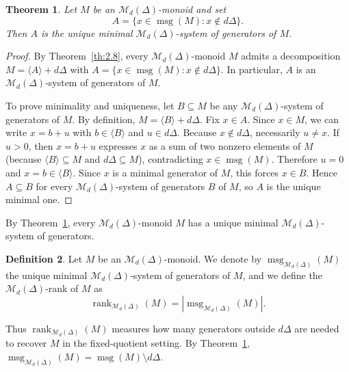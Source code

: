 \documentclass[12pt,a4paper]{amsart}
\newtheorem{theorem}{Theorem}[section]
\theoremstyle{definition}
\newtheorem{definition}[theorem]{Definition}
\theoremstyle{remark}
\begin{document}
\begin{theorem}\label{thm:Md-min-gen}
Let $M$ be an $\mathcal{M}_d(\Delta)$-monoid and set
\[
A=\{x\in \operatorname{msg}(M): x\notin d\Delta\}.
\]
Then $A$ is the unique minimal $\mathcal{M}_d(\Delta)$-system of generators of $M$.
\end{theorem}

\begin{proof}
By Theorem~\ref{th:2.8}, every $\mathcal{M}_d(\Delta)$-monoid $M$ admits a decomposition $M=\langle A\rangle+d\Delta$ with 
$A=\{x\in \operatorname{msg}(M): x\notin d\Delta\}$. In particular, $A$ is an $\mathcal{M}_d(\Delta)$-system of generators of $M$.

To prove minimality and uniqueness, let $B\subseteq M$ be any $\mathcal{M}_d(\Delta)$-system of generators of $M$. By definition,
$M=\langle B\rangle+d\Delta$. Fix $x\in A$. Since $x\in M$, we can write $x=b+u$ with $b\in\langle B\rangle$ and $u\in d\Delta$.
Because $x\notin d\Delta$, necessarily $u\neq x$. If $u>0$, then $x=b+u$ expresses $x$ as a sum of two nonzero elements of $M$
(because $\langle B\rangle\subseteq M$ and $d\Delta\subseteq M$), contradicting $x\in\operatorname{msg}(M)$. Therefore $u=0$ and $x=b\in\langle B\rangle$. Since $x$ is a minimal generator of $M$, this forces $x\in B$. Hence $A\subseteq B$ for every $\mathcal{M}_d(\Delta)$-system of generators $B$ of $M$, so $A$ is the unique minimal one.
\end{proof}

By Theorem~\ref{thm:Md-min-gen}, every \(\mathcal{M}_d(\Delta)\)-monoid \(M\) has a unique
minimal \(\mathcal{M}_d(\Delta)\)-system of generators.

\begin{definition}
Let \(M\) be an \(\mathcal{M}_d(\Delta)\)-monoid. We denote by
$\operatorname{msg}_{\mathcal{M}_d(\Delta)}(M)$ the unique minimal \(\mathcal{M}_d(\Delta)\)-system of generators of \(M\),
and we define the \(\mathcal{M}_d(\Delta)\)-rank of \(M\) as
\[
\operatorname{rank}_{\mathcal{M}_d(\Delta)}(M)
=
\left|\operatorname{msg}_{\mathcal{M}_d(\Delta)}(M)\right|.
\]
\end{definition}

Thus \(\operatorname{rank}_{\mathcal{M}_d(\Delta)}(M)\) measures how many generators outside \(d\Delta\) are needed to recover \(M\) in the fixed-quotient setting. By Theorem~\ref{thm:Md-min-gen}, $\operatorname{msg}_{\mathcal{M}_d(\Delta)}(M) =
\operatorname{msg}(M)\setminus d\Delta$.
\end{document}
